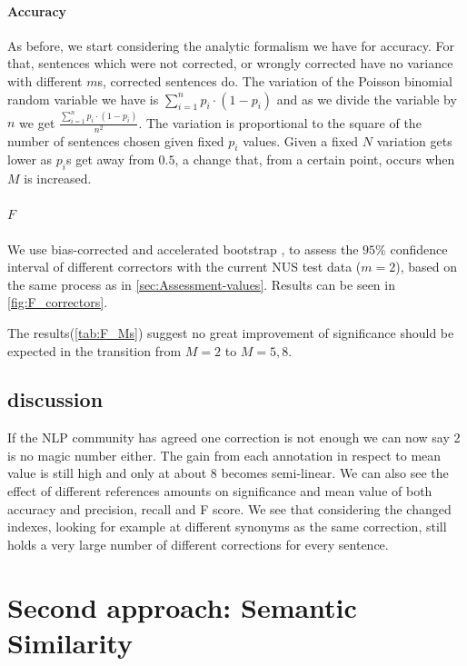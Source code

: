 \documentclass[english]{article}
\begin{document}
\paragraph{Accuracy}As before, we start considering the analytic formalism we have for accuracy. For that, sentences which were not corrected, or wrongly corrected have no variance with different $m$s, corrected sentences do. The variation of the Poisson binomial random variable we have is $\sum_{i=1}^{n}p_i\cdot\left(1-p_i\right)$ and as we divide the variable by $n$ we get $\frac{\sum_{i=1}^{n}p_i\cdot\left(1-p_i\right)}{n^2}$. 
The variation is proportional to the square of the number of sentences chosen given fixed $p_i$ values. Given a fixed $N$ variation gets lower as $p_i$s get away from $0.5$, a change that, from a certain point, occurs when $M$ is increased.

\paragraph{$F$}We use bias-corrected and accelerated bootstrap \cite{efron1987better}, to assess the $95\%$ confidence interval of different correctors with the current NUS test data ($m=2$), based on the same process as in \ref{sec:Assessment-values}. Results can be seen in \ref{fig:F_correctors}.

The results(\ref{tab:F_Ms}) suggest no great improvement of significance should be expected in the transition from $M=2$ to $M=5,8$.

\subsection{discussion}

If the NLP community has agreed one correction is not enough\cite{tetreault2008native}
we can now say 2 is no magic number either. The gain from each annotation in respect to mean value is still high and only at about 8 becomes semi-linear. We can also see the effect of different references amounts on significance and mean value of both accuracy and precision, recall and F score.
We see that considering the changed indexes, looking for example at different synonyms as the same correction, still holds a very large number of different corrections for every sentence.

\section{Second approach: Semantic Similarity\label{sec:Semantics}}
\end{document}

